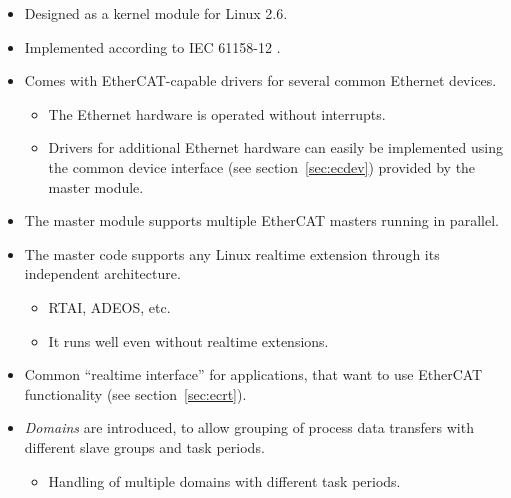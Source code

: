\documentclass[a4paper,12pt,BCOR6mm,bibtotoc,idxtotoc]{scrbook}
\begin{document}
\begin{itemize}

\item Designed as a kernel module for Linux 2.6.

\item Implemented according to IEC 61158-12 \cite{dlspec} \cite{alspec}.

\item Comes with EtherCAT-capable drivers for several common Ethernet devices.

  \begin{itemize}

  \item The Ethernet hardware is operated without interrupts.

  \item Drivers for additional Ethernet hardware can easily be implemented
  using the common device interface (see section~\ref{sec:ecdev}) provided by
  the master module.

  \end{itemize}

\item The master module supports multiple EtherCAT masters running in
parallel.

\item The master code supports any Linux realtime extension through its
independent architecture.

  \begin{itemize}

  \item RTAI,
  ADEOS, etc.

  \item It runs well even without realtime extensions.

  \end{itemize}

\item Common ``realtime interface'' for applications, that want to use
EtherCAT functionality (see section~\ref{sec:ecrt}).

\item \textit{Domains} are introduced, to allow grouping of process
  data transfers with different slave groups and task periods.

  \begin{itemize}

  \item Handling of multiple domains with different task periods.


\end{itemize}
\end{itemize}
\end{document}
